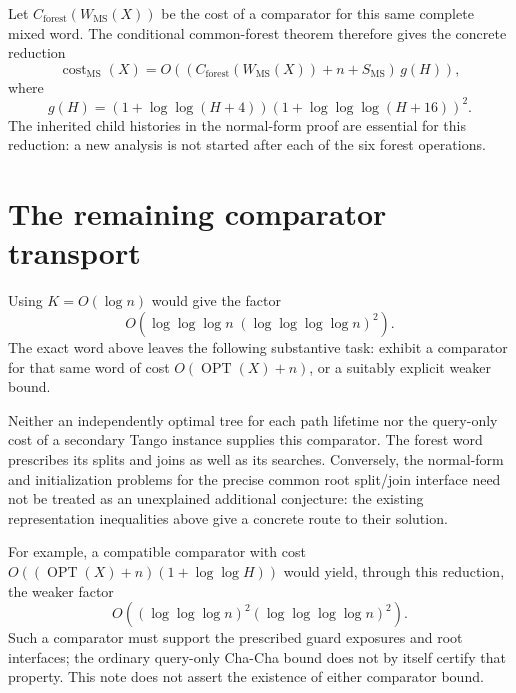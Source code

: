 \documentclass[11pt]{article}
\newcommand{\cost}{\operatorname{cost}}
\newcommand{\OPT}{\operatorname{OPT}}
\newcommand{\MS}{\mathrm{MS}}
\begin{document}
Let $C_{\mathrm{forest}}(W_{\MS}(X))$ be the cost of a comparator for
this same complete mixed word. The conditional common-forest theorem
therefore gives the concrete reduction
\[
 \cost_{\MS}(X)
 =O\!\left((C_{\mathrm{forest}}(W_{\MS}(X))+n+S_{\MS})\,g(H)\right),
\]
where
\[
 g(H)=(1+\log\log(H+4))
      (1+\log\log\log(H+16))^2.
\]
The inherited child histories in the normal-form proof are essential
for this reduction: a new analysis is not started after each of the
six forest operations.

\section{The remaining comparator transport}

Using $K=O(\log n)$ would give the factor
\[
 O(\log\log\log n\;(\log\log\log\log n)^2).
\]
The exact word above leaves the following substantive task: exhibit a
comparator for that same word of cost
$O(\OPT(X)+n)$, or a suitably explicit weaker bound.

Neither an independently optimal tree for each path lifetime nor the
query-only cost of a secondary Tango instance supplies this comparator.
The forest word prescribes its splits and joins as well as its searches.
Conversely, the normal-form and initialization problems for the precise
common root split/join interface need not be treated as an unexplained
additional conjecture: the existing representation inequalities above
give a concrete route to their solution.

For example, a compatible comparator with cost
$O((\OPT(X)+n)(1+\log\log H))$ would yield, through this reduction,
the weaker factor
\[
 O\!\left((\log\log\log n)^2
          (\log\log\log\log n)^2\right).
\]
Such a comparator must support the prescribed guard exposures and
root interfaces; the ordinary query-only Cha-Cha bound does not
by itself certify that property. This note does not assert the
existence of either comparator bound.
\end{document}
